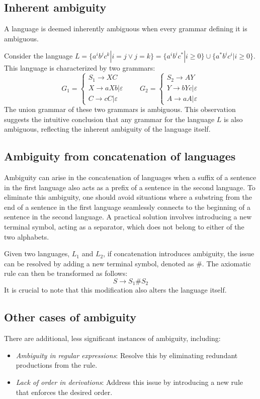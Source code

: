 \subsection{Inherent ambiguity}
A language is deemed inherently ambiguous when every grammar defining it is ambiguous.
\begin{example}
    Consider the language $L=\{a^ib^jc^k|i=j \lor j=k\}=\{a^ib^ic^{*}|i \geq 0\} \cup \{a^{*}b^ic^i|i \geq 0\}$. 
    This language is characterized by two grammars:
    \[G_1=\begin{cases}
        S_1 \rightarrow XC \\
        X \rightarrow aXb|\varepsilon \\
        C \rightarrow cC|\varepsilon
    \end{cases}    
    \qquad G_2=\begin{cases}
        S_2 \rightarrow AY \\
        Y \rightarrow bYc|\varepsilon \\
        A \rightarrow aA|\varepsilon
    \end{cases}\]
    The union grammar of these two grammars is ambiguous.
    This observation suggests the intuitive conclusion that any grammar for the language $L$ is also ambiguous, reflecting the inherent ambiguity of the language itself.
\end{example}

\subsection{Ambiguity from concatenation of languages}
Ambiguity can arise in the concatenation of languages when a suffix of a sentence in the first language also acts as a prefix of a sentence in the second language.
To eliminate this ambiguity, one should avoid situations where a substring from the end of a sentence in the first language seamlessly connects to the beginning of a sentence in the second language.
A practical solution involves introducing a new terminal symbol, acting as a separator, which does not belong to either of the two alphabets.
\begin{example}
    Given two languages, $L_1$ and $L_2$, if concatenation introduces ambiguity, the issue can be resolved by adding a new terminal symbol, denoted as $\#$.
    The axiomatic rule can then be transformed as follows:
    \[S \rightarrow S_1 \# S_2\]
    It is crucial to note that this modification also alters the language itself.
\end{example}

\subsection{Other cases of ambiguity}
There are additional, less significant instances of ambiguity, including:
\begin{itemize}
    \item \textit{Ambiguity in regular expressions}: Resolve this by eliminating redundant productions from the rule.
    \item \textit{Lack of order in derivations}: Address this issue by introducing a new rule that enforces the desired order.
\end{itemize}